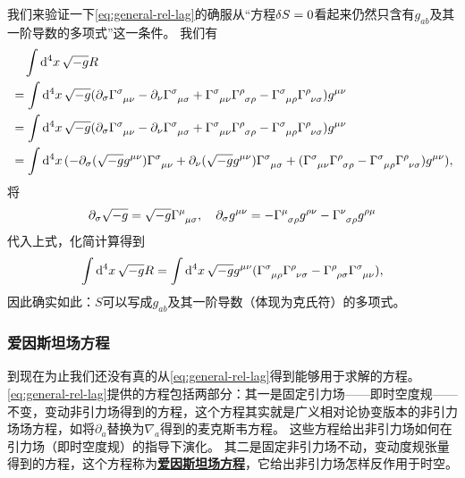 \documentclass[hyperref, UTF8, a4paper]{ctexart}
\newcommand*{\concept}[1]{\underline{\textbf{#1}}}
\begin{document}
我们来验证一下\eqref{eq:general-rel-lag}的确服从“方程$\var{S} = 0$看起来仍然只含有$g_{ab}$及其一阶导数的多项式”这一条件。
我们有
\[
    \begin{aligned}
        &\quad \int \dd[4]{x} \sqrt{-g} R \\
        &= \int \dd[4]{x} \sqrt{-g} (\partial_{\sigma} \Gamma\indices{^\sigma_{\mu \nu}} - \partial_\nu \Gamma\indices{^\sigma_{\mu \sigma}} + \Gamma\indices{^\sigma_{\mu \nu}} \Gamma\indices{^\rho_{\sigma \rho}} - \Gamma\indices{^\sigma_{\mu \rho}} \Gamma\indices{^\rho_{\nu \sigma}}) g^{\mu \nu} \\
        &= \int \dd[4]{x} \sqrt{-g} (\partial_{\sigma} \Gamma\indices{^\sigma_{\mu \nu}} - \partial_\nu \Gamma\indices{^\sigma_{\mu \sigma}} + \Gamma\indices{^\sigma_{\mu \nu}} \Gamma\indices{^\rho_{\sigma \rho}} - \Gamma\indices{^\sigma_{\mu \rho}} \Gamma\indices{^\rho_{\nu \sigma}}) g^{\mu \nu} \\
        &= \int \dd[4]{x} ( - \partial_\sigma (\sqrt{-g} g^{\mu \nu}) \Gamma\indices{^\sigma_{\mu \nu}} + \partial_\nu (\sqrt{-g} g^{\mu \nu}) \Gamma\indices{^\sigma_{\mu \sigma}} + (\Gamma\indices{^\sigma_{\mu \nu}} \Gamma\indices{^\rho_{\sigma \rho}} - \Gamma\indices{^\sigma_{\mu \rho}} \Gamma\indices{^\rho_{\nu \sigma}}) g^{\mu \nu} ),
    \end{aligned}
\]
将
\[
    \partial_\sigma \sqrt{-g} = \sqrt{-g} \Gamma\indices{^\mu_{\mu \sigma}}, \quad \partial_\sigma g^{\mu \nu} = - \Gamma\indices{^\mu_{\sigma \rho}} g^{\rho \nu} - \Gamma\indices{^\nu_{\sigma \rho}} g^{\rho \mu}
\]
代入上式，化简计算得到
\begin{equation}
    \int \dd[4]{x} \sqrt{-g} R = \int \dd[4]{x} \sqrt{-g} g^{\mu \nu} (\Gamma\indices{^\sigma_{\mu \rho}} \Gamma\indices{^\rho_{\nu \sigma}} - \Gamma\indices{^\rho_{\rho \sigma}} \Gamma\indices{^\sigma_{\mu \nu}}),
\end{equation}
因此确实如此：$S$可以写成$g_{ab}$及其一阶导数（体现为克氏符）的多项式。

\subsubsection{爱因斯坦场方程}

到现在为止我们还没有真的从\eqref{eq:general-rel-lag}得到能够用于求解的方程。
\eqref{eq:general-rel-lag}提供的方程包括两部分：其一是固定引力场——即时空度规——不变，变动非引力场得到的方程，这个方程其实就是广义相对论协变版本的非引力场场方程，如将$\partial_a$替换为$\nabla_a$得到的麦克斯韦方程。
这些方程给出非引力场如何在引力场（即时空度规）的指导下演化。
其二是固定非引力场不动，变动度规张量得到的方程，这个方程称为\concept{爱因斯坦场方程}，它给出非引力场怎样反作用于时空。
\end{document}
